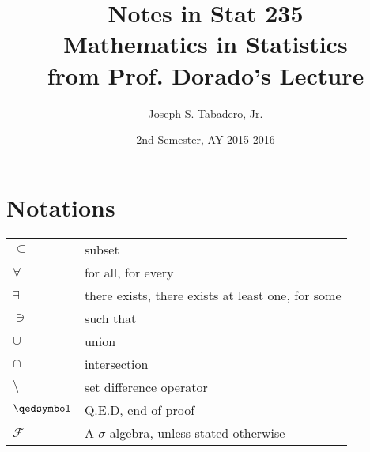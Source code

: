 \documentclass{amsbook}
\title{Notes in Stat 235\\
	Mathematics in Statistics\\
	from Prof. Dorado's Lecture
	}
\author{Joseph S. Tabadero, Jr.}
\date{2nd Semester, AY 2015-2016}
\newcommand{\F}{\ensuremath{\mathcal F}}
\begin{document}
\maketitle
\tableofcontents

\chapter*{Notations}

\begin{tabular}{ll}
$\subset $ & subset\\
$\forall$ & for all, for every\\
$\exists$ & there exists, there exists at least one, for some\\
$\ni$ & such that\\
$\cup$ & union\\
$\cap$ & intersection\\
$\setminus$ & set difference operator\\
$\qedsymbol$ & Q.E.D, end of proof\\
$\F$ & A $\sigma$-algebra, unless stated otherwise\\
\end{tabular}
























\end{document}
